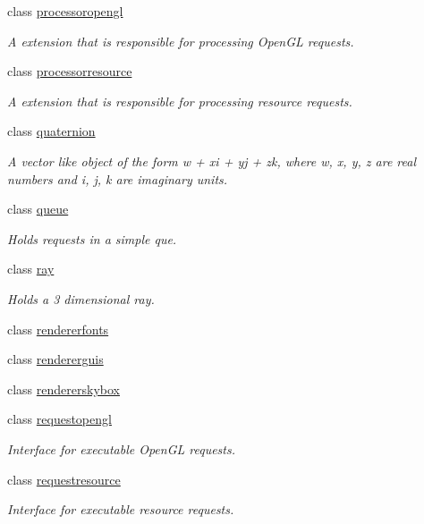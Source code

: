 \begin{DoxyCompactItemize}
class \hyperlink{classflounder_1_1processoropengl}{processoropengl}
\begin{DoxyCompactList}\small\item\em A extension that is responsible for processing Open\+GL requests. \end{DoxyCompactList}\item 
class \hyperlink{classflounder_1_1processorresource}{processorresource}
\begin{DoxyCompactList}\small\item\em A extension that is responsible for processing resource requests. \end{DoxyCompactList}\item 
class \hyperlink{classflounder_1_1quaternion}{quaternion}
\begin{DoxyCompactList}\small\item\em A vector like object of the form w + xi + yj + zk, where w, x, y, z are real numbers and i, j, k are imaginary units. \end{DoxyCompactList}\item 
class \hyperlink{classflounder_1_1queue}{queue}
\begin{DoxyCompactList}\small\item\em Holds requests in a simple que. \end{DoxyCompactList}\item 
class \hyperlink{classflounder_1_1ray}{ray}
\begin{DoxyCompactList}\small\item\em Holds a 3 dimensional ray. \end{DoxyCompactList}\item 
class \hyperlink{classflounder_1_1rendererfonts}{rendererfonts}
\item 
class \hyperlink{classflounder_1_1rendererguis}{rendererguis}
\item 
class \hyperlink{classflounder_1_1rendererskybox}{rendererskybox}
\item 
class \hyperlink{classflounder_1_1requestopengl}{requestopengl}
\begin{DoxyCompactList}\small\item\em Interface for executable Open\+GL requests. \end{DoxyCompactList}\item 
class \hyperlink{classflounder_1_1requestresource}{requestresource}
\begin{DoxyCompactList}\small\item\em Interface for executable resource requests. \end{DoxyCompactList}\item 

\end{DoxyCompactItemize}
